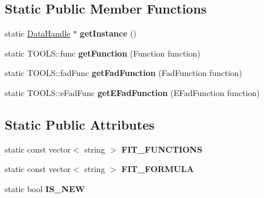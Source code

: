 \subsection*{Static Public Member Functions}
\begin{DoxyCompactItemize}
\item 
\hypertarget{classDataHandle_ace9a04d469e246e810d0953801eed10c}{static \hyperlink{classDataHandle}{Data\-Handle} $\ast$ {\bfseries get\-Instance} ()}\label{classDataHandle_ace9a04d469e246e810d0953801eed10c}

\item 
\hypertarget{classDataHandle_af126956f60c91b8a1a6e05c5d43c1c99}{static T\-O\-O\-L\-S\-::func {\bfseries get\-Function} (Function function)}\label{classDataHandle_af126956f60c91b8a1a6e05c5d43c1c99}

\item 
\hypertarget{classDataHandle_af87301e4edc221aefa777be9ec348368}{static T\-O\-O\-L\-S\-::fad\-Func {\bfseries get\-Fad\-Function} (Fad\-Function function)}\label{classDataHandle_af87301e4edc221aefa777be9ec348368}

\item 
\hypertarget{classDataHandle_ab0c8ed010b5f8a04bbb6bfa0055cda3b}{static T\-O\-O\-L\-S\-::e\-Fad\-Func {\bfseries get\-E\-Fad\-Function} (E\-Fad\-Function function)}\label{classDataHandle_ab0c8ed010b5f8a04bbb6bfa0055cda3b}

\end{DoxyCompactItemize}
\subsection*{Static Public Attributes}
\begin{DoxyCompactItemize}
\item 
\hypertarget{classDataHandle_a7cefcf02c9a59b111225dfc5491a8160}{static const vector$<$ string $>$ {\bfseries F\-I\-T\-\_\-\-F\-U\-N\-C\-T\-I\-O\-N\-S}}\label{classDataHandle_a7cefcf02c9a59b111225dfc5491a8160}

\item 
\hypertarget{classDataHandle_a8ea25e4b96194720f7f1133d9b560637}{static const vector$<$ string $>$ {\bfseries F\-I\-T\-\_\-\-F\-O\-R\-M\-U\-L\-A}}\label{classDataHandle_a8ea25e4b96194720f7f1133d9b560637}

\item 
\hypertarget{classDataHandle_af754b84ee488b481af4f4ada4e7c7a97}{static bool {\bfseries I\-S\-\_\-\-N\-E\-W}}\label{classDataHandle_af754b84ee488b481af4f4ada4e7c7a97}

\end{DoxyCompactItemize}
